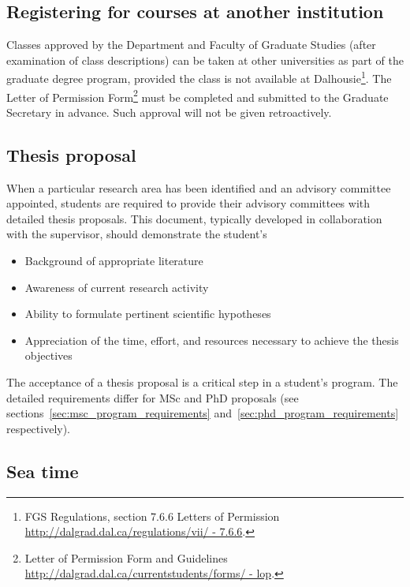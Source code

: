\documentclass{article}
\newcommand\elink[1]{\url{#1}}
\begin{document}
\subsection{Registering for courses at another institution}

Classes approved by the Department and Faculty of Graduate Studies (after
examination of class descriptions) can be taken at other universities as part
of the graduate degree program, provided the class is not available at
Dalhousie\footnote{FGS Regulations, section 7.6.6 Letters of Permission
\elink{http://dalgrad.dal.ca/regulations/vii/ - 7.6.6}.}.  The Letter of
Permission Form\footnote{Letter of Permission Form and Guidelines
\elink{http://dalgrad.dal.ca/currentstudents/forms/ - lop}.} must be completed
and submitted to the Graduate Secretary in advance. Such approval will not be
given retroactively.


\subsection{Thesis proposal}

When a particular research area has been identified and an advisory committee
appointed, students are required to provide their advisory committees with
detailed thesis proposals. This document, typically developed in collaboration
with the supervisor, should demonstrate the student's

\begin{itemize}
\item Background of appropriate literature
\item Awareness of current research activity
\item Ability to formulate pertinent scientific hypotheses
\item Appreciation of the time, effort, and resources necessary to achieve the thesis objectives
\end{itemize}

The acceptance of a thesis proposal is a critical step in a student's program.
The detailed requirements differ for MSc and PhD proposals (see
sections~\ref{sec:msc_program_requirements}
and~\ref{sec:phd_program_requirements} respectively).

\subsection{Sea time}
\end{document}
